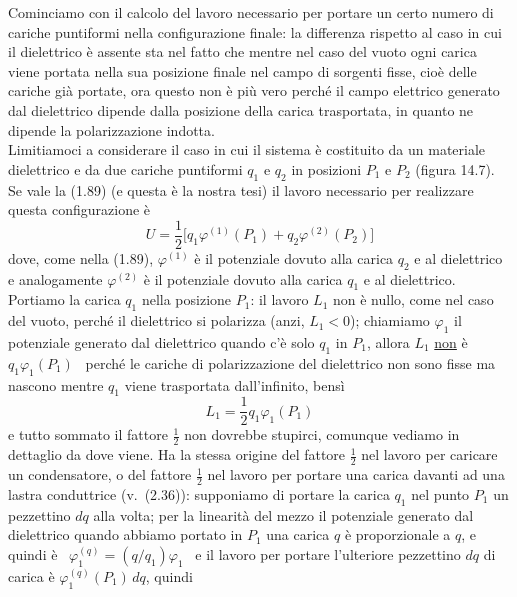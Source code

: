 Cominciamo con il calcolo del lavoro necessario per portare un certo numero di
cariche puntiformi nella configurazione finale: la differenza rispetto al caso
in cui il dielettrico \`e assente sta nel fatto che mentre nel caso del vuoto
ogni carica viene portata nella sua posizione finale nel campo di sorgenti
fisse, cio\`e delle cariche gi\`a portate, ora questo non \`e pi\`u vero
perch\'e il campo elettrico generato dal dielettrico dipende dalla posizione
della carica trasportata, in quanto ne dipende la polarizzazione indotta.\\
Limitiamoci a considerare il caso in cui il sistema \`e costituito da un
materiale dielettrico e da due cariche puntiformi $q_1$ e $q_2$ in posizioni
$P_1$ e $P_2$ (figura 14.7). Se vale la (1.89) (e questa \`e la nostra tesi) il
lavoro necessario per realizzare questa configurazione \`e
\begin{equation}
  U=\frac{1}{2}\big[q_1\varphi^{(1)}(P_1)+q_2\varphi^{(2)}(P_2)\big]
  \tag{14.50}
\end{equation}
dove, come nella (1.89), $\varphi^{(1)}$ \`e il potenziale dovuto alla carica
$q_2$ e al dielettrico e analogamente $\varphi^{(2)}$ \`e il potenziale dovuto
alla carica $q_1$ e al dielettrico.\\
Portiamo la carica $q_1$ nella posizione $P_1$: il lavoro $L_1$ non \`e nullo,
come nel caso del vuoto, perch\'e il dielettrico si polarizza (anzi, $L_1<0$);
chiamiamo $\varphi_1$ il potenziale generato dal dielettrico quando c'\`e solo
$q_1$ in $P_1$, allora $L_1$ \underline{non} \`e \ $q_1\varphi_1(P_1)$
\ perch\'e le cariche di polarizzazione del dielettrico non sono fisse ma
nascono mentre $q_1$ viene trasportata dall'infinito, bens\`i
\begin{equation}
  L_1=\frac{1}{2}q_1\varphi_1(P_1)
  \tag{14.51}
\end{equation}
e tutto sommato il fattore $\frac{1}{2}$ non dovrebbe stupirci, comunque vediamo
in dettaglio da dove viene. Ha la stessa origine del fattore $\frac{1}{2}$ nel
lavoro per caricare un condensatore, o del fattore $\frac{1}{2}$ nel lavoro per
portare una carica davanti ad una lastra conduttrice \big(v.\ (2.36)\big):
supponiamo di portare la carica $q_1$ nel punto $P_1$ un pezzettino $dq$ alla
volta; per la linearit\`a del mezzo il potenziale generato dal dielettrico
quando abbiamo portato in $P_1$ una carica $q$ \`e proporzionale a $q$, e quindi
\`e \ $\varphi_1^{(q)}=(q/q_1)\varphi_1$ \ e il lavoro per portare l'ulteriore
pezzettino $dq$ di carica \`e $\varphi_1^{(q)}(P_1)\,dq$, quindi

